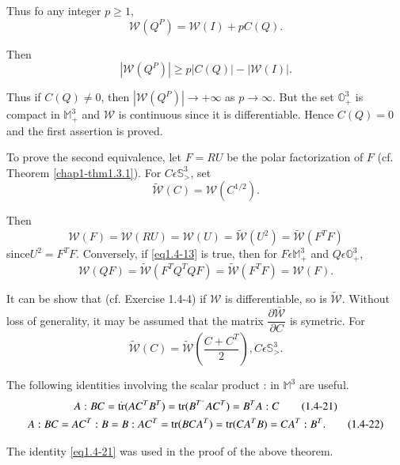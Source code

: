 Thus fo any integer $p \geq 1$, 
\begin{equation*}
  \mathcal{W}(Q^{P}) = \mathcal{W}(I) + p C(Q). \tag{1.4-19}\label{eq1.4-19}
\end{equation*}

Then 
$$
| \mathcal{W} (Q ^{P}) | \geq p | C (Q) | - | \mathcal{W}(I)|.
$$

Thus if $C (Q) \neq 0$, then $| \mathcal{W} (Q ^{P}) | \to + \infty $
as $p \to \infty$. But the set $\mathbb{O}^{3}_{+}$ is compact in
$\mathbb{M}^{3}_{+}$ and $\mathcal{W}$ is continuous since it is
differentiable. Hence $C(Q) = 0 $ and the first assertion is proved. 

To prove the second equivalence, let $F = RU$ be the polar
factorization of $F$ (cf. Theorem \ref{chap1-thm1.3.1}). For $C \epsilon
\mathbb{S}^{3}_{>}$, set  
\begin{equation*}
\tilde{\mathcal{W}} (C) = \mathcal{W}(C^{1/2}). \tag{1.4-20}\label{eq1.4-20}
\end{equation*}

Then 
$$
\mathcal{W} (F) = \mathcal{W}(RU) = \mathcal{W}(U) =
\tilde{\mathcal{W}}(U^{2}) = \tilde{\mathcal{W}}(F^{T}F) 
$$
since\pageoriginale $U^{2} = F^{T}F$. Conversely, if \eqref{eq1.4-13}
is true, then for $F 
\epsilon \mathbb{M}^{3}_{+}$ and $Q \epsilon
\mathbb{O}^{3}_{+}$, 
$$
\mathcal{W}(QF) = \tilde{\mathcal{W}} (F^{T}Q^{T}QF) =
\tilde{\mathcal{W}} (F^{T}F) = \mathcal{W} (F). 
$$

It can be show that (cf. Exercise 1.4-4) if $\mathcal{W}$ is
differentiable, so is $\mathcal{\tilde{W}}$. Without loss of generality, it
may be assumed that the matrix $\dfrac{\partial
  \bar{\mathcal{W}}}{\partial C}$ is symetric. For  
$$
\tilde{\mathcal{W}} (C) = \tilde{\mathcal{W}} (\frac{C +C^{T}}{2}), C
\epsilon \mathbb{S}^{3}_{>}. 
$$

\begin{remark}\label{chap1-rem1.4.2}%
  The following identities involving the scalar product : in
  $\mathbb{M}^{3}$ are useful. 
  \begin{gather*}
    A : BC = \dot{\operatorname{tr}}(AC^{T}B^{T}) = \operatorname{tr} (B^{T^-}AC^{T}) = B^{T}A:C
    \tag{1.4-21}\label{eq1.4-21}\\ 
    A : BC = AC^{T} : B = B: AC^{T} = \operatorname{tr}(BCA^{T}) = \operatorname{tr} (CA^{T}B) = CA^{T}
    : B^{T}. \tag{1.4-22} \label{eq1.4-22}
  \end{gather*}

  The identity \eqref{eq1.4-21} was used in the proof of the above theorem. 
\end{remark}

